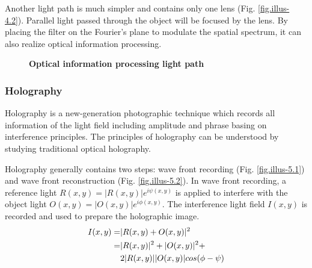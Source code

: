 \documentclass[10pt,a4paper,twocolumn,twoside,UTF8]{article}
\begin{document}
		Another light path is much simpler and contains only one lens (Fig. \ref{fig.illus-4.2}). 
		Parallel light passed through the object will be focused by the lens. 
		By placing the filter on the Fourier's plane to modulate the spatial spectrum, it can also realize optical information processing.

		\begin{figure}[htbp]
			\centering		
			\caption{\textbf{Optical information processing light path}}
		\end{figure}


		\subsubsection{Holography}
		Holography is a new-generation photographic technique which records all information of the light field including amplitude and phrase basing on interference principles.
		The principles of holography can be understood by studying traditional optical holography. 
		
		Holography generally contains two steps: wave front recording (Fig. \ref{fig.illus-5.1}) and wave front reconstruction (Fig. \ref{fig.illus-5.2}).
		In wave front recording, a reference light $R(x,y) = |R(x,y)|e^{i\psi(x,y)}$ is applied to interfere with the object light $O(x,y) = |O(x,y)|e^{i\phi(x,y)}$. 
		The interference light field $I(x, y)$ is recorded and used to prepare the holographic image. 
		\begin{align}
			I(x,y) =& |R(x,y)+O(x,y)|^2 \notag \\
				   =& |R(x,y)|^2+|O(x,y)|^2 + \notag \\
				    &2|R(x,y)||O(x,y)|cos(\phi-\psi) 
			\label{eq.5.1}
		\end{align}
\end{document}
